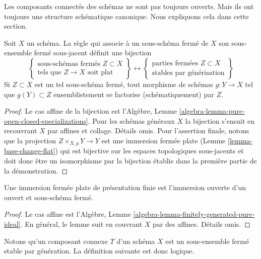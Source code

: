 \noindent
Les composants connectés des schémas ne sont pas toujours ouverts. Mais ils ont toujours
une structure schématique canonique. Nous expliquons cela dans cette section.

\begin{lemma}
\label{lemma-characterize-flat-closed-immersions}
Soit $X$ un schéma. La règle qui associe à un sous-schéma fermé de $X$
son sous-ensemble fermé sous-jacent définit une bijection
$$
\left\{
\begin{matrix}
\text{sous-schémas fermés }Z \subset X \\
\text{tels que }Z \to X\text{ soit plat}
\end{matrix}
\right\}
\leftrightarrow
\left\{
\begin{matrix}
\text{parties fermées }Z \subset X \\
\text{stables par générisation}
\end{matrix}
\right\}
$$
Si $Z \subset X$ est un tel sous-schéma fermé, tout morphisme de schémas $g : Y \to X$
tel que $g(Y) \subset Z$ ensemblistement se factorise
(schématiquement) par $Z$.
\end{lemma}

\begin{proof}
Le cas affine de la bijection est
l'Algèbre, Lemme \ref{algebra-lemma-pure-open-closed-specializations}. Pour les schémas généraux $X$
la bijection s'ensuit en recouvrant $X$ par affines et collage.
Détails omis. Pour l'assertion finale, notons que la projection
$Z \times_{X, g} Y \to Y$ est une immersion fermée plate
(Lemme \ref{lemma-base-change-flat}) qui est bijective sur les espaces topologiques
sous-jacents et doit donc être un isomorphisme
par la bijection établie dans la première partie de la démonstration.
\end{proof}

\begin{lemma}
\label{lemma-flat-closed-immersions-finite-presentation}
Une immersion fermée plate de présentation finie est
l'immersion ouverte d'un ouvert et sous-schéma fermé.
\end{lemma}

\begin{proof}
Le cas affine est
l'Algèbre, Lemme \ref{algebra-lemma-finitely-generated-pure-ideal}. En général, le lemme suit
en couvrant $X$ par des affines. Détails
omis.
\end{proof}

\noindent
Notons qu'un composant connexe $T$ d'un schéma $X$ est un
sous-ensemble fermé stable par génération. La définition suivante est donc
logique.

